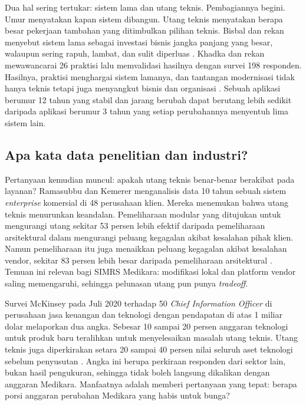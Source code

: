 Dua hal sering tertukar: sistem lama dan utang teknis. Pembagiannya begini. Umur menyatakan kapan sistem dibangun. Utang teknis menyatakan
berapa besar pekerjaan tambahan yang ditimbulkan pilihan teknis. Bisbal dan rekan menyebut sistem lama sebagai investasi bisnis jangka panjang
yang besar, walaupun sering rapuh, lambat, dan sulit diperluas \cite{c07-bisbal1999}. Khadka dan rekan mewawancarai 26 praktisi lalu memvalidasi
hasilnya dengan survei 198 responden. Hasilnya, praktisi menghargai sistem lamanya, dan tantangan modernisasi tidak hanya teknis tetapi juga
menyangkut bisnis dan organisasi \cite{c07-khadka2014}. Sebuah aplikasi berumur 12 tahun yang stabil dan jarang berubah dapat berutang lebih
sedikit daripada aplikasi berumur 3 tahun yang setiap perubahannya menyentuh lima sistem lain.

\subsection*{Apa kata data penelitian dan industri?}

Pertanyaan kemudian muncul: apakah utang teknis benar-benar berakibat pada layanan? Ramasubbu dan Kemerer menganalisis data 10 tahun sebuah
sistem \textit{enterprise} komersial di 48 perusahaan klien. Mereka menemukan bahwa utang teknis menurunkan keandalan. Pemeliharaan modular
yang ditujukan untuk mengurangi utang sekitar 53 persen lebih efektif daripada pemeliharaan arsitektural dalam mengurangi peluang kegagalan
akibat kesalahan pihak klien. Namun pemeliharaan itu juga menaikkan peluang kegagalan akibat kesalahan vendor, sekitar 83 persen lebih besar
daripada pemeliharaan arsitektural \cite{c07-ramasubbu2016}. Temuan ini relevan bagi SIMRS Medikara: modifikasi lokal dan platform vendor saling memengaruhi, sehingga
pelunasan utang pun punya \textit{tradeoff}.

Survei McKinsey pada Juli 2020 terhadap 50 \textit{Chief Information Officer} di perusahaan jasa keuangan dan teknologi dengan pendapatan di atas
1 miliar dolar melaporkan dua angka. Sebesar 10 sampai 20 persen anggaran teknologi untuk produk baru teralihkan untuk menyelesaikan masalah utang
teknis. Utang teknis juga diperkirakan setara 20 sampai 40 persen nilai seluruh aset teknologi sebelum penyusutan \cite{c07-mckinsey2020}. Angka ini berupa perkiraan
responden dari sektor lain, bukan hasil pengukuran, sehingga tidak boleh langsung dikalikan dengan anggaran Medikara. Manfaatnya adalah
memberi pertanyaan yang tepat: berapa porsi anggaran perubahan Medikara yang habis untuk bunga?


